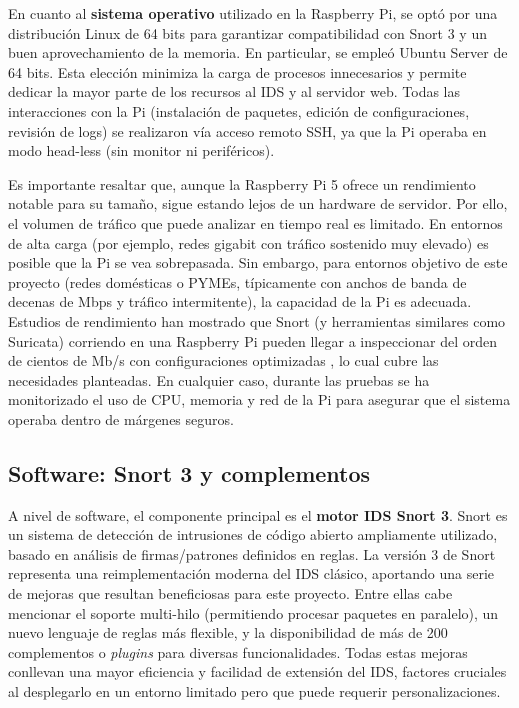\documentclass[11pt,a4paper,twoside]{report}
\begin{document}
En cuanto al \textbf{sistema operativo} utilizado en la Raspberry Pi, se optó por una distribución Linux de 64 bits para garantizar compatibilidad con Snort 3 y un buen aprovechamiento de la memoria. En particular, se empleó Ubuntu Server de 64 bits. Esta elección minimiza la carga de procesos innecesarios y permite dedicar la mayor parte de los recursos al IDS y al servidor web. Todas las interacciones con la Pi (instalación de paquetes, edición de configuraciones, revisión de logs) se realizaron vía acceso remoto SSH, ya que la Pi operaba en modo head-less (sin monitor ni periféricos).\newline

Es importante resaltar que, aunque la Raspberry Pi 5 ofrece un rendimiento notable para su tamaño, sigue estando lejos de un hardware de servidor. Por ello, el volumen de tráfico que puede analizar en tiempo real es limitado. En entornos de alta carga (por ejemplo, redes gigabit con tráfico sostenido muy elevado) es posible que la Pi se vea sobrepasada. Sin embargo, para entornos objetivo de este proyecto (redes domésticas o PYMEs, típicamente con anchos de banda de decenas de Mbps y tráfico intermitente), la capacidad de la Pi es adecuada. Estudios de rendimiento han mostrado que Snort (y herramientas similares como Suricata) corriendo en una Raspberry Pi pueden llegar a inspeccionar del orden de cientos de Mb/s con configuraciones optimizadas \cite{SecMaster2024}, lo cual cubre las necesidades planteadas. En cualquier caso, durante las pruebas se ha monitorizado el uso de CPU, memoria y red de la Pi para asegurar que el sistema operaba dentro de márgenes seguros.\newline

\subsection{Software: Snort 3 y complementos}
A nivel de software, el componente principal es el \textbf{motor IDS Snort 3}. Snort es un sistema de detección de intrusiones de código abierto ampliamente utilizado, basado en análisis de firmas/patrones definidos en reglas. La versión 3 de Snort representa una reimplementación moderna del IDS clásico, aportando una serie de mejoras que resultan beneficiosas para este proyecto. Entre ellas cabe mencionar el soporte multi-hilo (permitiendo procesar paquetes en paralelo), un nuevo lenguaje de reglas más flexible, y la disponibilidad de más de 200 complementos o \emph{plugins} para diversas funcionalidades. Todas estas mejoras conllevan una mayor eficiencia y facilidad de extensión del IDS, factores cruciales al desplegarlo en un entorno limitado pero que puede requerir personalizaciones.\newline
\end{document}
